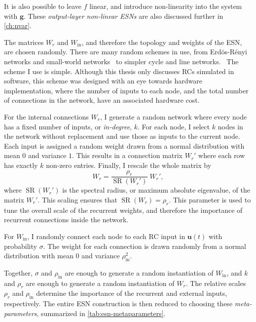 It is also possible to leave $f$ linear, and introduce non-linearity
into the system with $\bm{g}$. These \emph{output-layer non-linear ESNs} are
also discussed further in \cref{ch:nvar}.

The matrices $W_r$ and $W_\text{in}$, and therefore the topology and
weights of the ESN, are chosen randomly. There are many random schemes
in use, from Erd{\"{o}}s-R{\'{e}}nyi networks and small-world
networks~\cite{haluszczynski2019} to simpler cycle and line
networks.~\cite{rodan2011} The scheme I use is simple. Although this
thesis only discusses RCs simulated in software, this scheme was
designed with an eye towards hardware implementation, where the number
of inputs to each node, and the total number of connections in the
network, have an associated hardware cost.

For the internal connections $W_r$, I generate a random network where
every node has a fixed number of inputs, or \emph{in-degree}, $k$. For
each node, I select $k$ nodes in the network without replacement and
use those as inputs to the current node. Each input is assigned a
random weight drawn from a normal distribution with mean $0$ and
variance $1$. This results in a connection matrix $W_r'$ where each
row has exactly $k$ non-zero entries. Finally, I rescale the whole
matrix by
\begin{equation}
  \label{eq:setradius}
  W_r = \frac{\rho_r}{\operatorname{SR}(W_r')}\;W_r',
\end{equation}
where $\operatorname{SR}(W_r')$ is the spectral radius, or maximum
absolute eigenvalue, of the matrix $W_r'$. This scaling ensures that
$\operatorname{SR}(W_r) = \rho_r$. This parameter is used to tune the
overall scale of the recurrent weights, and therefore the importance
of recurrent connections inside the network.

For $W_\text{in}$, I randomly connect each node to each RC input in
$\bm{u}(t)$ with probability $\sigma$. The weight for each connection
is drawn randomly from a normal distribution with mean $0$ and
variance $\rho_\text{in}^2$.

Together, $\sigma$ and $\rho_\text{in}$ are enough to generate a
random instantiation of $W_\text{in}$, and $k$ and $\rho_r$ are enough
to generate a random instantiation of $W_r$. The relative scales
$\rho_r$ and $\rho_\text{in}$ determine the importance of the
recurrent and external inputs, respectively. The entire ESN construction
is then reduced to choosing these \emph{meta-parameters}, summarized in
\cref{tab:esn-metaparameters}.

